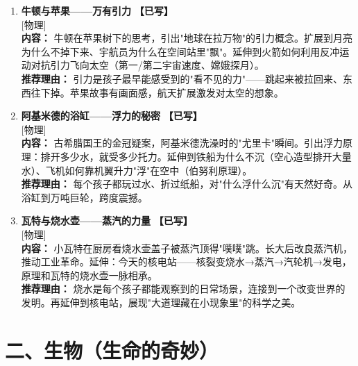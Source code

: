 \documentclass[a4paper,12pt]{ctexart}
\newcommand{\tagphysics}{\textcolor{physics}{\small [物理]}}
\newcommand{\done}{\textcolor{donegreen}{\textbf{【已写】}}}
\begin{document}
\begin{enumerate}

\item[\textbf{第1课}] \textbf{牛顿与苹果——万有引力} \done \\
\tagphysics \\
\textbf{内容：} 牛顿在苹果树下的思考，引出"地球在拉万物"的引力概念。扩展到月亮为什么不掉下来、宇航员为什么在空间站里"飘"。延伸到火箭如何利用反冲运动对抗引力飞向太空（第一/第二宇宙速度、嫦娥探月）。\\
\textbf{推荐理由：} 引力是孩子最早能感受到的"看不见的力"——跳起来被拉回来、东西往下掉。苹果故事有画面感，航天扩展激发对太空的想象。

\item[\textbf{第2课}] \textbf{阿基米德的浴缸——浮力的秘密} \done \\
\tagphysics \\
\textbf{内容：} 古希腊国王的金冠疑案，阿基米德洗澡时的"尤里卡"瞬间。引出浮力原理：排开多少水，就受多少托力。延伸到铁船为什么不沉（空心造型排开大量水）、飞机如何靠机翼升力"浮"在空中（伯努利原理）。\\
\textbf{推荐理由：} 每个孩子都玩过水、折过纸船，对"什么浮什么沉"有天然好奇。从浴缸到万吨巨轮，跨度震撼。

\item[\textbf{第3课}] \textbf{瓦特与烧水壶——蒸汽的力量} \done \\
\tagphysics \\
\textbf{内容：} 小瓦特在厨房看烧水壶盖子被蒸汽顶得"噗噗"跳。长大后改良蒸汽机，推动工业革命。延伸：今天的核电站——核裂变烧水→蒸汽→汽轮机→发电，原理和瓦特的烧水壶一脉相承。\\
\textbf{推荐理由：} 烧水是每个孩子都能观察到的日常场景，连接到一个改变世界的发明。再延伸到核电站，展现"大道理藏在小现象里"的科学之美。

\end{enumerate}

\section*{\textcolor{orange!80!black}{二、生物（生命的奇妙）}}
\end{document}
